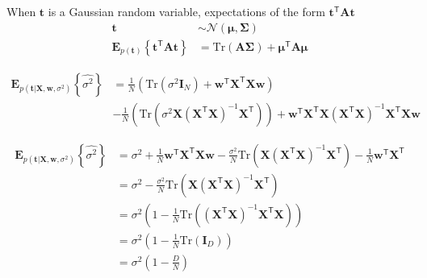 \documentclass[a4paper,11pt]{article} %
\begin{document}
When $\mathbf{t}$ is a Gaussian random variable, expectations of the form
$\mathbf{t}^{\mathsf{T}}\mathbf{A}\mathbf{t}$
\begin{align*}
\mathbf{t} & \sim \mathcal{N}(\boldsymbol{\mu},\boldsymbol{\Sigma}) \\
\mathbf{E}_{p(\mathbf{t})}\left\{
\mathbf{t}^{\mathsf{T}}\mathbf{A}\mathbf{t}
\right\} & = \mathrm{Tr}(\mathbf{A}\boldsymbol{\Sigma}) + \boldsymbol{\mu}^{\mathsf{T}}
\mathbf{A}\boldsymbol{\mu}
\end{align*}

\begin{align*}
\mathbf{E}_{p(\mathbf{t}|\mathbf{X},\mathbf{w},\sigma^2)}
\left\{\widehat{\sigma^2}\right\} & = \frac{1}{N}
\left(
\mathrm{Tr}(\sigma^2\mathbf{I}_{N}) + \mathbf{w}^{\mathsf{T}}\mathbf{X}^{\mathsf{T}}
\mathbf{X}\mathbf{w}
\right) \\
& - \frac{1}{N}\left(
\mathrm{Tr}(\sigma^2\mathbf{X}(\mathbf{X}^{\mathsf{T}}\mathbf{X})^{-1}\mathbf{X}^{\mathsf{T}})
\right) +
\mathbf{w}^{\mathsf{T}}\mathbf{X}^{\mathsf{T}}
\mathbf{X}(\mathbf{X}^{\mathsf{T}}\mathbf{X})^{-1}\mathbf{X}^{\mathsf{T}}\mathbf{X}\mathbf{w}
\end{align*}


\begin{align*}
\mathbf{E}_{p(\mathbf{t}|\mathbf{X},\mathbf{w},\sigma^2)}
\left\{\widehat{\sigma^2}\right\} & = \sigma^2 +
\frac{1}{N}\mathbf{w}^{\mathsf{T}}\mathbf{X}^{\mathsf{T}}
\mathbf{X}\mathbf{w} -
\frac{\sigma^2}{N}
\mathrm{Tr}( \mathbf{X} (\mathbf{X}^{\mathsf{T}}\mathbf{X})^{-1}\mathbf{X}^{\mathsf{T}} )
- \frac{1}{N}\mathbf{w}^{\mathsf{T}}\mathbf{X}^{\mathsf{T}} \\
& = \sigma^2 -
\frac{\sigma^2}{N}
\mathrm{Tr}( \mathbf{X} (\mathbf{X}^{\mathsf{T}}\mathbf{X})^{-1}\mathbf{X}^{\mathsf{T}} ) \\
& = \sigma^2 \left(
1 - \frac{1}{N}\mathrm{Tr}( (\mathbf{X}^{\mathsf{T}}\mathbf{X})^{-1}\mathbf{X}^{\mathsf{T}}\mathbf{X} )
\right) \\
& = \sigma^2 \left( 1 - \frac{1}{N}\mathrm{Tr}(\mathbf{I}_{D}) \right) \\
& = \sigma^2 \left( 1 - \frac{D}{N} \right)
\end{align*}



\end{document}
